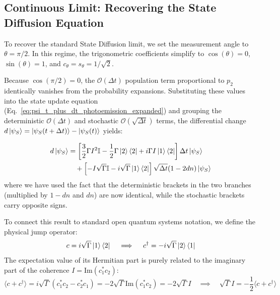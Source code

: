 \documentclass[a4paper,12pt]{article}
\begin{document}
\subsection{Continuous Limit: Recovering the State Diffusion Equation}

To recover the standard State Diffusion limit, we set the measurement angle to $ \theta = \pi/2 $. In this regime, the trigonometric coefficients simplify to $ \cos(\theta) = 0 $, $ \sin(\theta) = 1 $, and $ c_\theta = s_\theta = 1/\sqrt{2} $. 

Because $ \cos(\pi/2) = 0 $, the $ \mathcal{O}(\Delta t) $ population term proportional to $ p_2 $ identically vanishes from the probability expansions. Substituting these values into the state update equation (Eq.~\ref{eq:psi_t_plus_dt_photoemission_expanded}) and grouping the deterministic $ \mathcal{O}(\Delta t) $ and stochastic $ \mathcal{O}(\sqrt{\Delta t}) $ terms, the differential change $ d\ket{\psi_S} = \ket{\psi_S(t+\Delta t)} - \ket{\psi_S(t)} $ yields:

\begin{align}
	d\ket{\psi_{S}} &= \left[ \frac{3}{2}\Gamma I^2 \mathbb{I} - \frac{1}{2}\Gamma\ket{2}\bra{2} + i \Gamma I \ket{1}\bra{2} \right] \Delta t \ket{\psi_{S}} \notag \\
	&\quad + \left[ -I\sqrt{\Gamma}\mathbb{I} - i\sqrt{\Gamma}\ket{1}\bra{2} \right] \sqrt{\Delta t} (1 - 2dn) \ket{\psi_{S}}
	\label{eq:raw_SD_update}
\end{align}
where we have used the fact that the deterministic brackets in the two branches (multiplied by $ 1-dn $ and $ dn $) are now identical, while the stochastic brackets carry opposite signs.

To connect this result to standard open quantum systems notation, we define the physical jump operator:
\begin{equation}
	c = i\sqrt{\Gamma}\ket{1}\bra{2} \quad \implies \quad c^\dagger = -i\sqrt{\Gamma}\ket{2}\bra{1}
\end{equation}
The expectation value of its Hermitian part is purely related to the imaginary part of the coherence $ I = \text{Im}(c_1^* c_2) $:
\begin{equation}
	\langle c + c^\dagger \rangle = i\sqrt{\Gamma}(c_1^* c_2 - c_2^* c_1) = -2\sqrt{\Gamma}\text{Im}(c_1^* c_2) = -2\sqrt{\Gamma}I \quad \implies \quad \sqrt{\Gamma}I = -\frac{1}{2}\langle c + c^\dagger \rangle
	\label{eq:expectation_jump}
\end{equation}
\end{document}
